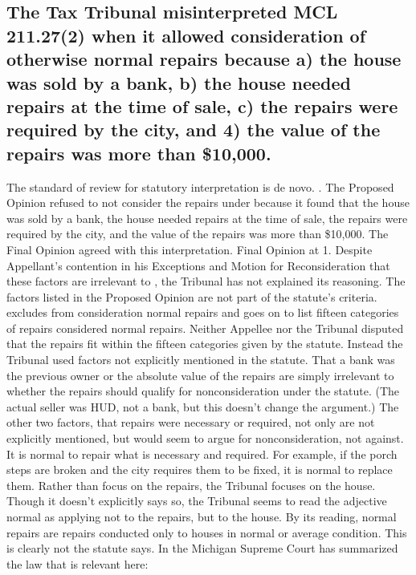 \documentclass[12pt,\documentclassflag]{michiganCourtOfAppealsBrief}
\begin{document}
\subsection{The Tax Tribunal misinterpreted MCL 211.27(2) when it allowed consideration of otherwise normal repairs because a) the house was sold by a bank, b) the house needed repairs at the time of sale, c) the repairs were required by the city, and 4) the value of the repairs was more than \$10,000.}
 
The standard of review for statutory interpretation is de novo.  .
The Proposed Opinion refused to not consider the repairs under  because it found that the house was sold by a bank, the house needed repairs at the time of sale, the repairs were required by the city, and the value of the repairs was more than \$10,000. The Final Opinion agreed with this interpretation. Final Opinion at 1.  Despite Appellant's contention in his Exceptions and Motion for Reconsideration that these factors are irrelevant to , the Tribunal has not explained its reasoning. 
The factors listed in the Proposed Opinion are not part of the statute's criteria.  excludes from consideration normal repairs and goes on to list fifteen categories of repairs considered normal repairs. Neither Appellee nor the Tribunal disputed that the repairs fit within the fifteen categories given by the statute. Instead the Tribunal used factors not explicitly mentioned in the statute. That a bank was the previous owner or the absolute value of the repairs are simply irrelevant to whether the repairs should qualify for nonconsideration under the statute. (The actual seller was HUD, not a bank, but this doesn't change the argument.) The other two factors, that repairs were necessary or required, not only are not explicitly mentioned, but would seem to argue for nonconsideration, not against. It is normal to repair what is necessary and required. For example, if the porch steps are broken and the city requires them to be fixed, it is normal to replace them. 
Rather than focus on the repairs, the Tribunal focuses on the house. Though it doesn't explicitly says so, the Tribunal seems to read the adjective normal as applying not to the repairs, but to the house. By its reading, normal repairs are repairs conducted only to houses in normal or average condition. This is clearly not the statute says.
In \cite{SBC Health Midwest} the Michigan Supreme Court has summarized the law that is relevant here: 
\end{document}
